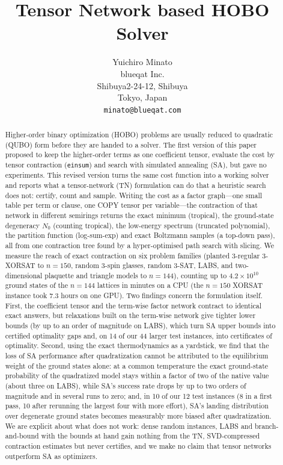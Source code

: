 \documentclass{article}
\title{Tensor Network based HOBO Solver}
\author{
  Yuichiro Minato \\
  blueqat Inc. \\
  Shibuya2-24-12, Shibuya \\
  Tokyo, Japan\\
  \texttt{minato@blueqat.com} \\
}
\newcommand{\N}{N_0}
\begin{document}
\maketitle

\begin{abstract}
Higher-order binary optimization (HOBO) problems are usually reduced to quadratic (QUBO) form before they are handed to a solver. The first version of this paper proposed to keep the higher-order terms as one coefficient tensor, evaluate the cost by tensor contraction (\texttt{einsum}) and search with simulated annealing (SA), but gave no experiments. This revised version turns the same cost function into a working solver and reports what a tensor-network (TN) formulation can do that a heuristic search does not: certify, count and sample. Writing the cost as a factor graph---one small table per term or clause, one COPY tensor per variable---the contraction of that network in different semirings returns the exact minimum (tropical), the ground-state degeneracy $\N$ (counting tropical), the low-energy spectrum (truncated polynomial), the partition function (log-sum-exp) and exact Boltzmann samples (a top-down pass), all from one contraction tree found by a hyper-optimised path search with slicing. We measure the reach of exact contraction on six problem families (planted 3-regular 3-XORSAT to $n{=}150$, random 3-spin glasses, random 3-SAT, LABS, and two-dimensional plaquette and triangle models to $n{=}144$), counting up to $4.2\times10^{10}$ ground states of the $n{=}144$ lattices in minutes on a CPU (the $n{=}150$ XORSAT instance took 7.3 hours on one GPU). Two findings concern the formulation itself. First, the coefficient tensor and the term-wise factor network contract to identical exact answers, but relaxations built on the term-wise network give tighter lower bounds (by up to an order of magnitude on LABS), which turn SA upper bounds into certified optimality gaps and, on 14 of our 44 larger test instances, into certificates of optimality. Second, using the exact thermodynamics as a yardstick, we find that the loss of SA performance after quadratization cannot be attributed to the equilibrium weight of the ground states alone: at a common temperature the exact ground-state probability of the quadratized model stays within a factor of two of the native value (about three on LABS), while SA's success rate drops by up to two orders of magnitude and in several runs to zero; and, in 10 of our 12 test instances (8 in a first pass, 10 after rerunning the largest four with more effort), SA's landing distribution over degenerate ground states becomes measurably more biased after quadratization. We are explicit about what does not work: dense random instances, LABS and branch-and-bound with the bounds at hand gain nothing from the TN, SVD-compressed contraction estimates but never certifies, and we make no claim that tensor networks outperform SA as optimizers.
\end{abstract}
\end{document}
